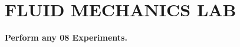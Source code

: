 \documentclass[12pt, a4paper]{article}
\begin{document}
                                                                                                                                                                                                                                                                                                                                                                                                                                                                                                                                                                                                                                                                                                                                                                        \section*{\centering \color{headerblue} FLUID MECHANICS LAB}
                                                                                                                                                                                                                                                                                                                                                                                                                                                                                                                                                                                                                                                                                                                                                                        \noindent \textbf{Perform any 08 Experiments.}
\end{document}
